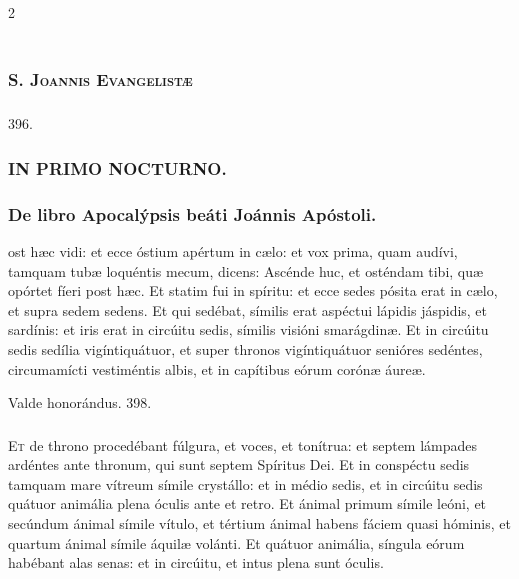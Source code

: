 \documentclass[9pt,twoside]{extarticle}
\begin{document}
\begin{multicols}{2}
\subsubsection*{\center {}\\ \textsc{S. Joannis Evangelistæ}}
\subsubsection*{\center {}}

\begin{tightlist}{}
\item {} 396. 
\end{tightlist}
\subsubsection*{\center \textsc{IN PRIMO NOCTURNO.}}
\subsubsection*{\center De libro Apocalýpsis beáti Joánnis Apóstoli.}
\begin{center}\end{center}
ost hæc vidi: et ecce óstium apértum in cælo: et vox prima, quam audívi, tamquam tubæ loquéntis mecum, dicens: Ascénde huc, et osténdam tibi, quæ opórtet fíeri post hæc.
Et statim fui in spíritu: et ecce sedes pósita erat in cælo, et supra sedem sedens.
Et qui sedébat, símilis erat aspéctui lápidis jáspidis, et sardínis: et iris erat in circúitu sedis, símilis visióni smarágdinæ.
Et in circúitu sedis sedília vigíntiquátuor, et super thronos vigíntiquátuor senióres sedéntes, circumamícti vestiméntis albis, et in capítibus eórum corónæ áureæ.

\begin{tightlist}{}
\item {} Valde honorándus. 398.
\end{tightlist}

\subsubsection*{\center {}}
\lettrine{E}t de throno procedébant fúlgura, et voces, et tonítrua: et septem lámpades ardéntes ante thronum, qui sunt septem Spíritus Dei.
Et in conspéctu sedis tamquam mare vítreum símile crystállo: et in médio sedis, et in circúitu sedis quátuor animália plena óculis ante et retro.
Et ánimal primum símile leóni, et secúndum ánimal símile vítulo, et tértium ánimal habens fáciem quasi hóminis, et quartum ánimal símile áquilæ volánti.
Et quátuor animália, síngula eórum habébant alas senas: et in circúitu, et intus plena sunt óculis.


\end{multicols}
\end{document}
